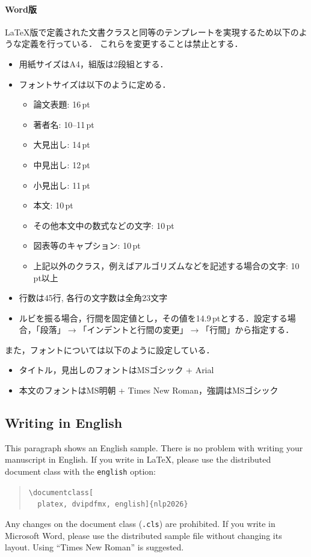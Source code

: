 \documentclass[
  platex, dvipdfmx,  %
]{nlp2026}
\newcommand{\code}[1]{\texttt{#1}}
\begin{document}
\paragraph{Word版}
LaTeX版で定義された文書クラスと同等のテンプレートを実現するため以下のような定義を行っている．
これらを変更することは禁止とする．
\begin{itemize}
    \item 用紙サイズはA4，組版は2段組とする．
    \item フォントサイズは以下のように定める．
    \begin{itemize}
        \item 論文表題: 16\,pt
        \item 著者名: 10--11\,pt
        \item 大見出し: 14\,pt
        \item 中見出し: 12\,pt
        \item 小見出し: 11\,pt
        \item 本文: 10\,pt
        \item その他本文中の数式などの文字: 10\,pt
        \item 図表等のキャプション: 10\,pt
        \item 上記以外のクラス，例えばアルゴリズムなどを記述する場合の文字: 10\,pt以上
    \end{itemize}
    \item 行数は45行, 各行の文字数は全角23文字
    \item ルビを振る場合，行間を固定値とし，その値を14.9\,ptとする．設定する場合，「段落」$\xrightarrow{}$「インデントと行間の変更」$\xrightarrow{}$「行間」から指定する．
\end{itemize}
また，フォントについては以下のように設定している．
\begin{itemize}
\item タイトル，見出しのフォントはMSゴシック + Arial
\item 本文のフォントはMS明朝 + Times New Roman，強調はMSゴシック
\end{itemize}


\subsection{Writing in English}
This paragraph shows an English sample.
There is no problem with writing your manuscript in English.
If you write in LaTeX, please use the distributed document class with the \code{english} option:
\begin{quote}
\verb|\documentclass[|\\
\verb|  platex, dvipdfmx, english]{nlp2026}|
\end{quote}
Any changes on the document class (\code{.cls}) are prohibited.
If you write in Microsoft Word, please use the distributed sample file without changing its layout.
Using ``Times New Roman'' is suggested.
\end{document}
